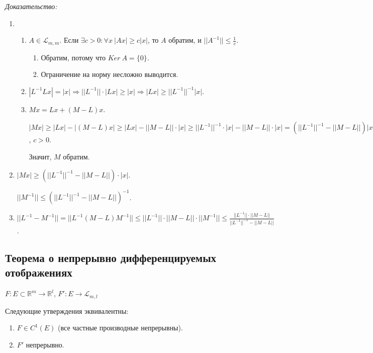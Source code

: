 \documentclass[paper=a4, fontsize=11pt]{article}
\begin{document}
\emph{Доказательство:}
\begin{enumerate}
    \item
    \begin{enumerate}
        \item $A \in \mathscr{L}_{m,m}$. Если $\exists c > 0: \forall x\ |Ax| \geq c|x|$, то $A$ обратим,
        и $||A^{-1}|| \leq \frac{1}{c}$.
        \begin{enumerate}
            \item Обратим, потому что $Ker\ A = \{0\}$.
            \item Ограничение на норму несложно выводится.
        \end{enumerate}
        \item $|L^{-1}Lx| = |x| \Rightarrow ||L^{-1}|| \cdot |Lx| \geq |x| \Rightarrow |Lx| \geq ||L^{-1}||^{-1} |x|$.
        \item $Mx = Lx + (M-L)x$.

        $|Mx| \geq |Lx| - |(M-L)x| \geq |Lx| - ||M-L||\cdot|x| \geq ||L^{-1}||^{-1}\cdot|x| - ||M-L||\cdot|x|
        = (||L^{-1}||^{-1} - ||M-L||) |x| = c|x|$, $c > 0$.

        Значит, $M$ обратим.
    \end{enumerate}
    \item $|Mx| \geq (||L^{-1}||^{-1} - ||M-L||) \cdot |x|$.
    
    $||M^{-1}|| \leq (||L^{-1}||^{-1} - ||M-L||)^{-1}$.
    \item $||L^{-1} - M^{-1}|| = ||L^{-1}(M-L)M^{-1}|| \leq ||L^{-1}||\cdot||M-L||\cdot||M^{-1}|| \leq
    \frac{||L^{-1}||\cdot||M-L||}{||L^{-1}||^{-1} - ||M-L||}$.

\end{enumerate}

\subsection{Теорема о непрерывно дифференцируемых отображениях}
$F: E \subset \mathds{R}^m \rightarrow \mathds{R}^l$, $F': E \rightarrow \mathscr{L}_{m,l}$

Следующие утверждения эквивалентны:
\begin{enumerate}
    \item $F \in C^1(E)$ (все частные производные непрерывны).
    \item $F'$ непрерывно.
\end{enumerate}
\end{document}
